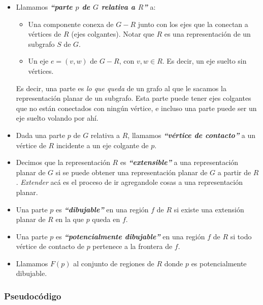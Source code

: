 \begin{itemize}
\item Llamamos \textbf{\emph{``parte $p$ de $G$ relativa a $R$''}} a:
    \begin{itemize}
    \item Una componente conexa de $G - R$ junto con los ejes que la conectan a v\'ertices de $R$ (ejes colgantes). Notar que $R$ es una representaci\'on de un subgrafo $S$ de $G$.
    \item Un eje $e = (v,w)$ de $G - R$, con $v,w \in R$. Es decir, un eje suelto sin v\'ertices. 
    \end{itemize}

    Es decir, una parte es \emph{lo que queda} de un grafo al que le sacamos la representaci\'on planar de un subgrafo. Esta parte puede tener ejes colgantes que no est\'an conectados con ning\'un v\'ertice, e incluso una parte puede ser un eje suelto volando por ah\'i.

\item Dada una parte $p$ de $G$ relativa a $R$, llamamos \textbf{\emph{``v\'ertice de contacto''}} a un v\'ertice de $R$ incidente a un eje colgante de $p$.
\item Decimos que la representaci\'on $R$ es \textbf{\emph{``extensible''}} a una representaci\'on planar de $G$ si se puede obtener una representaci\'on planar de $G$ a partir de $R$. \emph{Extender} ac\'a es el proceso de ir agregandole cosas a una representaci\'on planar.
\item Una parte $p$ es \textbf{\emph{``dibujable''}} en una regi\'on $f$ de $R$ si existe una extensi\'on planar de $R$ en la que $p$ queda en $f$.
\item Una parte $p$ es \textbf{\emph{``potencialmente dibujable''}} en una regi\'on $f$ de $R$ si todo v\'ertice de contacto de $p$ pertenece a la frontera de $f$.
\item Llamamos $F(p)$ al conjunto de regiones de $R$ donde $p$ es potencialmente dibujable.
\end{itemize}

\subsubsection{Pseudoc\'odigo}


